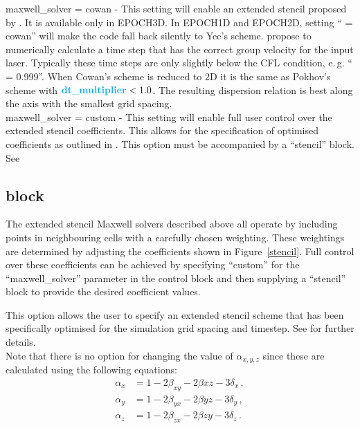 {\emphtext maxwell\_solver = cowan} - This setting will enable an extended
stencil proposed by \citet{Cowan2013}. It is available only in EPOCH3D. In
EPOCH1D and EPOCH2D, setting `` = cowan'' will make
the code fall back silently to Yee's scheme.
\citet{Cowan2013} propose to numerically calculate a time step that has the
correct group velocity for the input laser. Typically these time
steps are only slightly below the CFL condition, e.\,g.
`` = 0.999''.
When Cowan's scheme is reduced to 2D it is the same as Pokhov's scheme with
$\inlineemph{dt\_multiplier}<1.0$.
The resulting dispersion relation is best along the axis with the smallest grid
spacing.\\

{\emphtext maxwell\_solver = custom} - This setting will enable full user
control over the extended stencil coefficients. This allows for the
specification of optimised coefficients as outlined in \citet{Blinne2017}.
This option must be accompanied by a ``stencil'' block.
See~\\


\subsection{ block}
\label{sec:stencil_block}

The extended stencil Maxwell solvers described above all operate by
including points in neighbouring cells with a carefully chosen weighting.
These weightings are determined by adjusting the coefficients shown in
Figure~\ref{stencil}. Full control over these coefficients can be
achieved by specifying ``custom'' for the ``maxwell\_solver'' parameter
in the control block and then supplying a ``stencil'' block to provide
the desired coefficient values.

This option allows the user to specify an extended stencil scheme that
has been specifically optimised for the simulation grid spacing and timestep.
See \citet{Blinne2017} for further details.\\

Note that there is no option for changing the value of $\alpha_{x,y,z}$ since
these are calculated using the following  equations:
\begin{align*}
  \alpha_x &= 1 - 2\beta_{xy} - 2\beta{xz} - 3\delta_x\,, \\
  \alpha_y &= 1 - 2\beta_{yx} - 2\beta{yz} - 3\delta_y\,, \\
  \alpha_z &= 1 - 2\beta_{zx} - 2\beta{zy} - 3\delta_z\,.
\end{align*}

